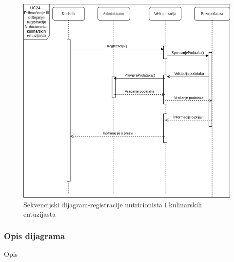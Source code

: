 					\begin{figure}[H]
						\centering
						\includegraphics[scale=0.5]{dijagrami/sekvencijski-dijagram-registracije-nutricionista-i-kulinarskih-entuzijasta.png}
						\caption{Sekvencijski dijagram-registracije nutricionista i kulinarskih entuzijasta}
						\label{fig:sekv-registracija}
					\end{figure}
					\subsubsection{Opis dijagrama}
						Opis
%				
				\eject
	
